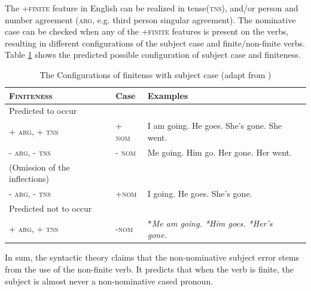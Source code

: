 The \textsc{+finite} feature in English can be realized in tense(\textsc{tns}), and/or person and number agreement (\textsc{arg}, e.g. third person singular agreement). The nominative case can be checked when any of the \textsc{+finite} features is present on the verbs, resulting in different configurations of the subject case and finite/non-finite verbs. Table \ref{tab: pattern} shows the predicted possible configuration of subject case and finiteness. 

\FloatBarrier
\begin{table}[!h]
    \centering
    \caption{The Configurations of finitenss with subject case (adapt from \cite{pine2005testing})}
    \begin{tabular}{llll}
    \toprule
        \textsc{Finiteness} & Case  & Examples  \\
    \hline
    Predicted to occur & & \\
         \textsc{+ arg, + tns} & \textsc{+ nom} & I am going. He goes. She's gone. She went.\\
         \textsc{- arg, - tns} & \textsc{- nom} & Me going. Him go. Her gone. Her went. \\
         (Omission of the inflections)\\
         \textsc{- arg, - tns} & \textsc{+nom} & I going. He goes. She's gone. \\
       \hline
       Predicted not to occur & & \\
       \textsc{+ arg, + tns} &  \textsc{-nom} & *\textit{Me am going. *Him goes. *Her's gone.} \\
        \bottomrule
    \end{tabular}
    \label{tab: pattern}
\end{table}
\FloatBarrier
In sum, the syntactic theory claims that the non-nominative subject error stems from the use of the non-finite verb. It predicts that when the verb is finite, the subject is almost never a non-nominative cased pronoun. 

